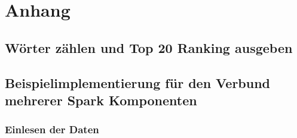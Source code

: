 \newpage
\chapter{Anhang} 

\section{Wörter zählen und Top 20 Ranking ausgeben}\label{code:wordcount}
\begin{figure}[h]
  \centering
\end{figure}

\newpage
\section{Beispielimplementierung für den Verbund mehrerer Spark Komponenten}
\subsection{Einlesen der Daten}\label{code:verbund_1}
\begin{figure}[h]
  \centering
\end{figure}

